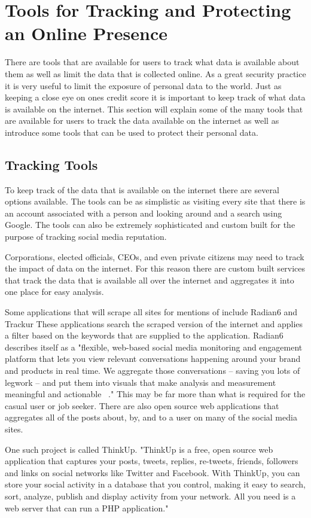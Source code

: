 \section{Tools for Tracking and Protecting an Online Presence} 
There are tools that are available for users to track what data is available
about them as well as limit the data that is collected online. As a great
security practice it is very useful to limit the exposure of personal data to
the world. Just as keeping a close eye on ones credit score it is important to
keep track of what data is available on the internet. This section will explain
some of the many tools that are available for users to track the data available
on the internet as well as introduce some tools that can be used to protect
their personal data.

\subsection{Tracking Tools} To keep track of the data that is available on the
internet there are several options available. The tools can be as simplistic as
visiting every site that there is an account associated with a person and
looking around and a search using Google. The tools can also be extremely
sophisticated and custom built for the purpose of tracking social media
reputation. 

Corporations, elected officials, CEOs, and even private citizens may need to
track the impact of data on the internet. For this reason there are custom built
services that track the data that is available all over the internet and
aggregates it into one place for easy analysis. 

Some applications that will scrape all sites for mentions of include
Radian6 and Trackur These applications search the scraped version of the
internet and applies a filter based on the keywords that are supplied to the
application. Radian6 describes itself as a "flexible, web-based social media
monitoring and engagement platform that lets you view relevant conversations
happening around your brand and products in real time. We aggregate those
conversations – saving you lots of legwork – and put them into visuals that make
analysis and measurement meaningful and actionable ~\cite{Radian6}." This may be
far more than what is required for the casual user or job seeker.  There are
also open source web applications that aggregates all of the posts about, by,
and to a user on many of the social media sites. 

One such project is called ThinkUp. "ThinkUp is a free, open source web
application that captures your posts, tweets, replies, re-tweets, friends,
followers and links on social networks like Twitter and Facebook. With ThinkUp,
you can store your social activity in a database that you control, making it
easy to search, sort, analyze, publish and display activity from your network.
All you need is a web server that can run a PHP application."~\cite{thinkup}

